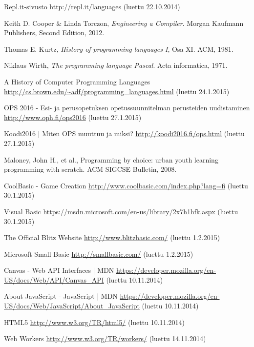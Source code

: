 
\begin{thebibliography}{99}

	Repl.it-sivusto \url{http://repl.it/languages} (luettu 22.10.2014)

	Keith D. Cooper \& Linda Torczon,
	\emph{Engineering a Compiler}.
	Morgan Kaufmann Publishers,
	Second Edition,
	2012.

	Thomas E. Kurtz,
	\emph{History of programming languages I}, Osa XI.
	ACM,
	1981.

	Niklaus Wirth,
	\emph{The programming language Pascal}.
	Acta informatica,
	1971.
	
	A History of Computer Programming Languages \url{http://cs.brown.edu/~adf/programming_languages.html} (luettu 24.1.2015)
	
	OPS 2016 - Esi- ja perusopetuksen opetussuunnitelman perusteiden uudistaminen \url{http://www.oph.fi/ops2016} (luettu 27.1.2015)

	Koodi2016 | Miten OPS muuttuu ja miksi? \url{http://koodi2016.fi/ops.html} (luettu 27.1.2015)

	Maloney, John H., et al.,
	Programming by choice: urban youth learning programming with scratch.
	ACM SIGCSE Bulletin,
	2008.

	CoolBasic - Game Creation \url{http://www.coolbasic.com/index.php?lang=fi} (luettu 30.1.2015)
	
	Visual Basic \url{https://msdn.microsoft.com/en-us/library/2x7h1hfk.aspx
} (luettu 30.1.2015)

	The Official Blitz Website \url{http://www.blitzbasic.com/} (luettu 1.2.2015)

	Microsoft Small Basic \url{http://smallbasic.com/} (luettu 1.2.2015)

	Canvas - Web API Interfaces | MDN \url{https://developer.mozilla.org/en-US/docs/Web/API/Canvas_API} (luettu 10.11.2014)

	About JavaScript - JavaScript | MDN \url{https://developer.mozilla.org/en-US/docs/Web/JavaScript/About_JavaScript} (luettu 10.11.2014)
	
	HTML5 \url{http://www.w3.org/TR/html5/} (luettu 10.11.2014)

	Web Workers \url{http://www.w3.org/TR/workers/} (luettu 14.11.2014)


\end{thebibliography}
